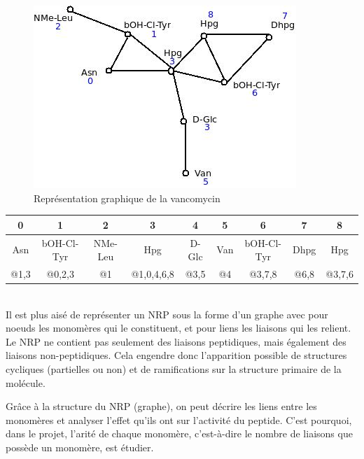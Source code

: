 \documentclass[a4paper,10pt]{report}
\begin{document}
	\begin{figure}[h]
	    \includegraphics[scale = 0.5]{image/vanco_mono.jpeg}
	    \caption{Représentation graphique de la vancomycin }
	\end{figure}
	
	\begin{flushleft}
	  \begin{tabular}{|c|c|c|c|c|c|c|c|c|}\hline
	    \color{blue}0 & \color{blue}1 & \color{blue}2 & \color{blue}3 & \color{blue}4 & \color{blue}5 & \color{blue}6 & \color{blue}7 & \color{blue}8 \\\hline
	    Asn & bOH-Cl-Tyr & NMe-Leu & Hpg & D-Glc & Van & bOH-Cl-Tyr & Dhpg & Hpg \\\hline
	    @1,3 & @0,2,3 & @1 & @1,0,4,6,8 & @3,5 & @4 & @3,7,8 & @6,8 & @3,7,6 \\\hline
	  \end{tabular}
	  \label{table0}
	 \end{flushleft}
	

	~~\\Il est plus aisé de représenter un NRP sous la forme d'un graphe avec pour noeuds les monomères qui le constituent, et pour liens les liaisons qui les relient.
	Le NRP ne contient pas seulement des liaisons peptidiques, mais également des liaisons non-peptidiques. Cela engendre donc l'apparition possible de structures cycliques (partielles ou non) et de ramifications sur la structure primaire de la molécule. 
	
	Grâce à la structure du NRP (graphe), on peut décrire les liens entre les monomères et analyser l'effet qu'ils ont sur l'activité du peptide.
	C'est pourquoi, dans le projet, l'arité de chaque monomère, c'est-à-dire le nombre de liaisons que possède un monomère, est étudier.
	
\end{document}
